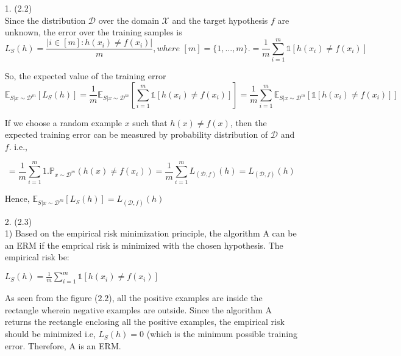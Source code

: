 \documentclass[12pt,letterpaper]{article}
\begin{document}
\begin{enumerate}
	

\item[1.] (2.2)\\
Since the distribution $\mathcal{D}$ over the domain $\mathcal{X}$ and the target hypothesis $f$ are unknown, the error over the training samples is 
\begin{equation*}
L_S(h) = \frac{|i\in [m] : h(x_i) \not= f(x_i)|}{m},
where \hspace{4pt} [m] = \{1, . . . , m\}.
= \frac{1}{m}\sum_{i=1}^m {\mathds{1}[h(x_i) \not= f(x_i)]}
\end{equation*}

So, the expected value of the training error 
\begin{equation*}
\mathbb{E}_{S|x \sim \mathcal{D}^m}[L_S(h)]
= \frac{1}{m} \mathbb{E}_{S|x \sim \mathcal{D}^m}\left [\sum_{i=1}^m {\mathds{1}[h(x_i) \not= f(x_i)]}\right ]
= \frac{1}{m}\sum_{i=1}^m  \mathbb{E}_{S|x \sim \mathcal{D}^m}\left [{\mathds{1}[h(x_i) \not= f(x_i)]}\right ]
\end{equation*}

If we choose a random example $x$ such that $h(x)\not= f(x)$, then the expected training error can be measured by probability distribution of $\mathcal{D}$ and $f$. i.e.,

\begin{equation*}
    = \frac{1}{m}\sum_{i=1}^m 1.\mathbb{P}_{x\sim \mathcal{D}^m}(h(x) \not= f(x_i))
    =\frac{1}{m}\sum_{i=1}^mL_{(\mathcal{D}, f)}(h)
    = L_{(\mathcal{D}, f)}(h)
\end{equation*}

Hence, $\mathbb{E}_{S|x\sim\mathcal{D}^m}\left[L_S(h)\right] = L_{(\mathcal{D}, f)}(h)$


\newpage



\item[2.] (2.3)\\
1) Based on the empirical risk minimization principle, the algorithm A can be an ERM if the emprical risk is minimized with the chosen hypothesis. The empirical risk be:\\
\begin{*equation}
$L_S(h) = \frac{1}{m}\sum_{i=1}^m {\mathds{1}[h(x_i) \not= f(x_i)]}$
\end{*equation}

As seen from the figure ($2.2$), all the positive examples are inside the rectangle wherein negative examples are outside. Since the algorithm A returns the rectangle enclosing all the positive examples, the empirical risk should be minimized i.e, $L_S(h) = 0$ (which is the minimum possible training error.  
Therefore, A is an ERM. \\


\end{enumerate}
\end{document}
